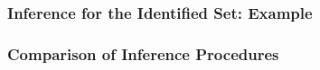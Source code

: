 \begin{frame}
\frametitle{Inference for the Identified Set: Example}

\begin{figure}[h!]
\begin{center}
\end{center}
\end{figure}	
\end{frame}
\begin{frame}
\frametitle{Comparison of Inference Procedures}

\begin{figure}[h!]
\begin{center}
\end{center}
\end{figure}	
\end{frame}

